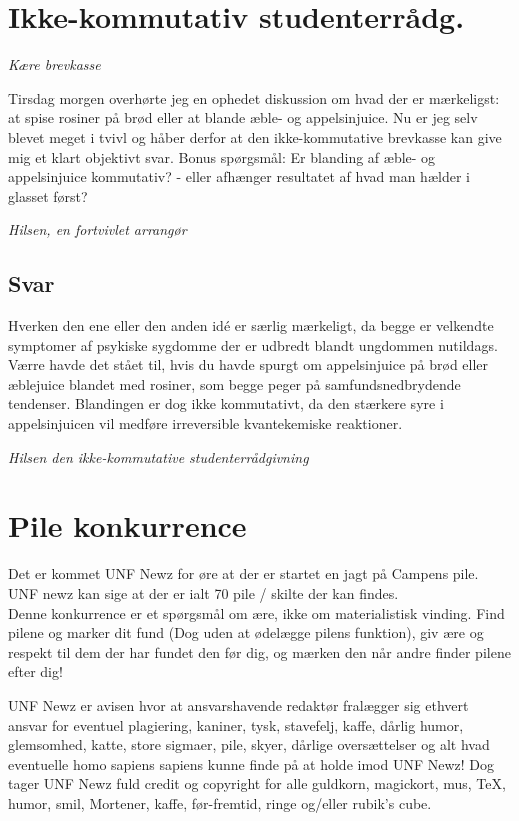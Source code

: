\begin{minipage}[b]{0.95\linewidth}
\begin{minipage}[t]{0.47\textwidth}
\section*{Ikke-kommutativ studenterrådg.}
\emph{Kære brevkasse}

Tirsdag morgen overhørte jeg en ophedet diskussion om hvad der er mærkeligst: at spise rosiner på brød eller at blande æble- og appelsinjuice. Nu er jeg selv blevet meget i tvivl og håber derfor at den ikke-kommutative brevkasse kan give mig et klart objektivt svar. Bonus spørgsmål: Er blanding af æble- og appelsinjuice kommutativ? - eller afhænger resultatet af hvad man hælder i glasset først?
 
\emph{Hilsen, en fortvivlet arrangør}

\subsection*{Svar}
Hverken den ene eller den anden idé er særlig mærkeligt, da begge er velkendte symptomer af psykiske sygdomme der er udbredt blandt ungdommen nutildags. Værre havde det stået til, hvis du havde spurgt om appelsinjuice på brød eller æblejuice blandet med rosiner, som begge peger på samfundsnedbrydende tendenser. Blandingen er dog ikke kommutativt, da den stærkere syre i appelsinjuicen vil medføre irreversible kvantekemiske reaktioner.

{\flushright\emph{Hilsen den ikke-kommutative studenterrådgivning}}


\vspace{-2mm}
\section*{Pile konkurrence}
Det er kommet UNF Newz for øre at der er startet en jagt på Campens pile. UNF newz kan sige at der er ialt 70 pile / skilte der kan findes. \\
Denne konkurrence er et spørgsmål om ære, ikke om materialistisk vinding. Find pilene og marker dit fund (Dog uden at ødelægge pilens funktion), giv ære og respekt til dem der har fundet den før dig, og mærken den når andre finder pilene efter dig!

\end{minipage}

\begin{center}
\tiny UNF Newz er avisen hvor at ansvarshavende redaktør fralægger sig ethvert ansvar for eventuel plagiering, kaniner, tysk, stavefelj, kaffe, dårlig humor, glemsomhed, katte, store sigmaer, pile, skyer, dårlige oversættelser og alt hvad eventuelle homo sapiens sapiens kunne finde på at holde imod UNF Newz! Dog tager UNF Newz fuld credit og copyright for alle guldkorn, magickort, mus, \TeX, humor, smil, Mortener, kaffe, før-fremtid, ringe og/eller rubik's cube.
\end{center}
\end{minipage}

